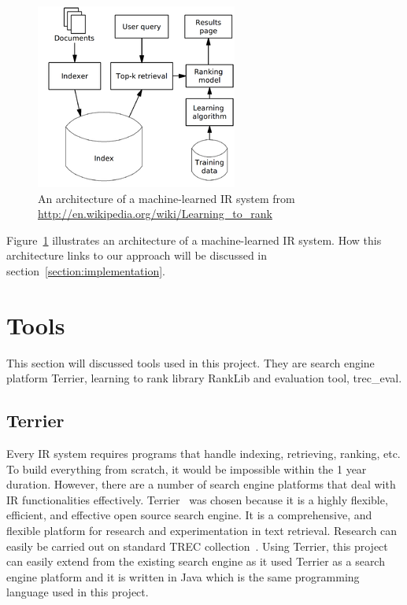 \begin{figure}
\centering
\includegraphics[scale=0.7]{./figures/letor.png}
\caption{An architecture of a machine-learned IR system from \protect\url{http://en.wikipedia.org/wiki/Learning_to_rank}} \label{fig:letor} 
\end{figure}
Figure~\ref{fig:letor} illustrates an architecture of a machine-learned IR system. How this architecture links to our approach will be discussed in
section~\ref{section:implementation}.

\section{Tools}
This section will discussed tools used in this project. They are search engine platform Terrier, learning to rank library RankLib and evaluation tool,
trec\_eval.
\subsection{Terrier}\label{section:terrier}
Every IR system requires programs that handle indexing, retrieving, ranking, etc. To build everything from scratch, it would be impossible within
the 1 year duration. However, there are a number of search engine platforms that deal with IR functionalities effectively.
Terrier~\cite{terrier} was chosen because it is a highly flexible, efficient, and effective open source search engine.
It is a comprehensive, and flexible platform for research and experimentation in text retrieval. Research can easily be 
carried out on standard TREC collection~\cite{trec}. 
Using Terrier, this project can easily extend from the existing search engine as it used Terrier as a search engine platform and it is written in Java
which is the same programming language used in this project.

